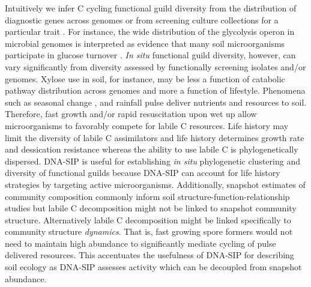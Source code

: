Intuitively we infer C cycling functional guild diversity from the distribution
of diagnostic genes across genomes \citep{Berlemont2013} or from screening
culture collections for a particular trait \citep{Martiny2013}. For
instance, the wide distribution of the glycolysis operon in microbial
genomes is interpreted as evidence that many soil microorganisms
participate in glucose turnover \citep{McGuire2010}. \textit{In situ}
functional guild diversity, however, can vary significantly from diversity
assessed by functionally screening isolates and/or genomes. Xylose use in soil,
for instance, may be less a function of catabolic pathway distribution across
genomes and more a function of lifestyle. Phenomena such as seasonal change
\citep{Schmidt2007}, and rainfall \citep{Placella2012} pulse deliver nutrients
and resources to soil. Therefore, fast growth and/or rapid resuscitation upon
wet up \citep{Placella2012} allow microorganisms to favorably compete for
labile C resources. Life history may limit the diversity of labile
C assimilators and life history determines growth rate and dessication
resistance whereas the ability to use labile C is phylogenetically dispersed.
DNA-SIP is useful for establishing \textit{in situ} phylogenetic clustering and
diversity of functional guilds because DNA-SIP can account for life history
strategies by targeting active microorganisms. Additionally, snapshot estimates
of community composition commonly inform soil structure-function-relationship
studies \citep{Fierer2007} but labile C decomposition might not be linked to
snapshot community structure. Alternatively labile C decomposition might be
linked specifically to community structure \textit{dynamics}. That is, fast
growing spore formers would not need to maintain high abundance to
significantly mediate cycling of pulse delivered resources. This accentuates
the usefulness of DNA-SIP for describing soil ecology as DNA-SIP assesses
activity which can be decoupled from snapshot abundance.


